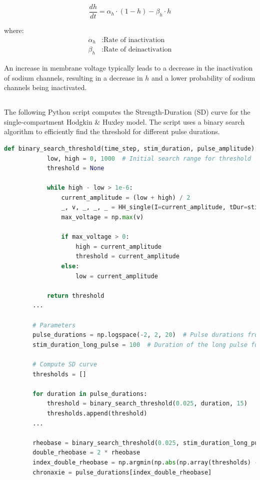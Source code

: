 \documentclass{article}
\begin{document}
    \[ \frac{dh}{dt} = \alpha_h \cdot (1 - h) - \beta_h \cdot h \]

    where:
    \begin{align*}
        \alpha_h & : \text{Rate of inactivation} \\
        \beta_h & : \text{Rate of deinactivation}
    \end{align*}

    An increase in membrane voltage typically leads to a decrease in the inactivation of sodium channels, resulting in a decrease in \(h\) and a lower probability of sodium channels being inactivated.

    \subsection{}

    The following Python script computes the Strength-Duration (SD) curve for the single-compartment Hodgkin \& Huxley model.
    The script uses a binary search algorithm to efficiently find the threshold for different pulse durations.

    \begin{lstlisting}[language=Python, style=mystyle]
        def binary_search_threshold(time_step, stim_duration, pulse_amplitude):
            low, high = 0, 1000  # Initial search range for threshold
            threshold = None

            while high - low > 1e-6:
                current_amplitude = (low + high) / 2
                _, v, _, _, _ = HH_single(I=current_amplitude, tDur=stim_duration)
                max_voltage = np.max(v)

                if max_voltage > 0:
                    high = current_amplitude
                    threshold = current_amplitude
                else:
                    low = current_amplitude

            return threshold
        ...

        # Parameters
        pulse_durations = np.logspace(-2, 2, 20)  # Pulse durations from 0.01 to 100 ms in 20 logarithmic steps
        stim_duration_long_pulse = 100  # Duration of the long pulse for rheobase calculation

        # Compute SD curve
        thresholds = []

        for duration in pulse_durations:
            threshold = binary_search_threshold(0.025, duration, 15)
            thresholds.append(threshold)
        ...

        rheobase = binary_search_threshold(0.025, stim_duration_long_pulse, 15)
        double_rheobase = 2 * rheobase
        index_double_rheobase = np.argmin(np.abs(np.array(thresholds) - double_rheobase))
        chronaxie = pulse_durations[index_double_rheobase]
    \end{lstlisting}
\end{document}
